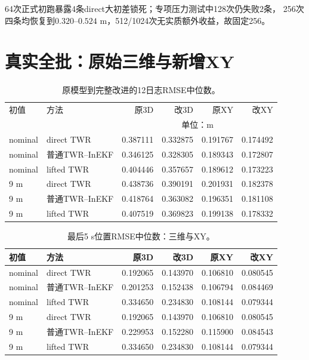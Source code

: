 \documentclass[11pt,a4paper]{ctexart}
\begin{document}
64次正式初跑暴露4条direct大初差锁死；专项压力测试中128次仍失败2条，
256次四条均恢复到$0.320$--$0.524$ m，512/1024次无实质额外收益，故固定256。

\section{真实全批：原始三维与新增XY}

\begin{table}[H]
\centering\small
\caption{原模型到完整改进的12日志RMSE中位数。}
\begin{tabular}{llrrrr}
\toprule
初值 & 方法 & 原3D & 改3D & 原XY & 改XY\\
 & & \multicolumn{4}{c}{单位：m}\\
\midrule
nominal & direct TWR & 0.387111 & 0.332875 & 0.191767 & 0.174492\\
nominal & 普通TWR--InEKF & 0.346125 & 0.328305 & 0.189343 & 0.172807\\
nominal & lifted TWR & 0.404446 & 0.357657 & 0.189612 & 0.173223\\
9 m & direct TWR & 0.438736 & 0.390191 & 0.201931 & 0.182378\\
9 m & 普通TWR--InEKF & 0.418764 & 0.363082 & 0.196351 & 0.181108\\
9 m & lifted TWR & 0.407519 & 0.369823 & 0.199138 & 0.178332\\
\bottomrule
\end{tabular}
\label{tab:main-result}
\end{table}

\begin{table}[H]
\centering\small
\caption{最后5 s位置RMSE中位数：三维与XY。}
\begin{tabular}{llrrrr}
\toprule
初值 & 方法 & 原3D & 改3D & 原XY & 改XY\\
\midrule
nominal & direct TWR & 0.192065 & 0.143970 & 0.106810 & 0.080545\\
nominal & 普通TWR--InEKF & 0.201253 & 0.152438 & 0.106794 & 0.084469\\
nominal & lifted TWR & 0.334650 & 0.234830 & 0.108144 & 0.079344\\
9 m & direct TWR & 0.192065 & 0.143970 & 0.106810 & 0.080545\\
9 m & 普通TWR--InEKF & 0.229953 & 0.152280 & 0.115900 & 0.084543\\
9 m & lifted TWR & 0.334650 & 0.234830 & 0.108144 & 0.079344\\
\bottomrule
\end{tabular}
\end{table}
\end{document}
